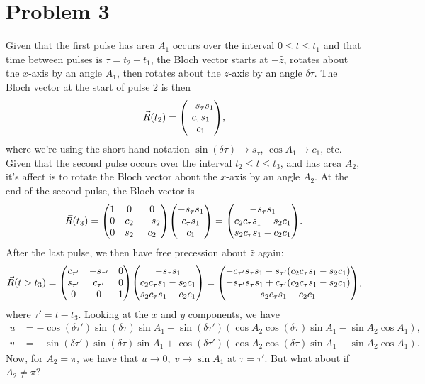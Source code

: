\documentclass[12pt]{article}
\begin{document}
\section*{Problem 3}
Given that the first pulse has area $A_1$ occurs over the interval $0 \leq t \leq t_1$ and that time between pulses is $\tau = t_2-t_1$, the Bloch vector starts at $-\hat{z}$, rotates about the $x$-axis by an angle $A_1$, then rotates about the $z$-axis by an angle $\delta \tau$.
The Bloch vector at the start of pulse 2 is then
\[ \vec{R}(t_2) = \mqty(-s_\tau s_1 \\ c_\tau s_1 \\ c_1), \]
where we're using the short-hand notation $\sin(\delta\tau) \to s_\tau$, $\cos A_1 \to c_1$, etc.
Given that the second pulse occurs over the interval $t_2 \leq t \leq t_3$, and has area $A_2$, it's affect is to rotate the Bloch vector about the $x$-axis by an angle $A_2$.
At the end of the second pulse, the Bloch vector is
\[ \vec{R}(t_3) = \mqty(1&0&0\\0&c_2&-s_2\\0&s_2&c_2)\mqty(-s_\tau s_1 \\ c_\tau s_1 \\ c_1) = \mqty(-s_\tau s_1 \\ c_2c_\tau s_1 - s_2 c_1\\ s_2 c_\tau s_1 - c_2c_1). \]
After the last pulse, we then have free precession about $\hat{z}$ again:
\[ \vec{R}(t>t_3) = \mqty(c_{\tau'}&-s_{\tau'}&0\\s_{\tau'}&c_{\tau'}&0\\0&0&1)\mqty(-s_\tau s_1 \\ c_2c_\tau s_1 - s_2 c_1\\ s_2 c_\tau s_1 - c_2c_1) = \mqty(-c_{\tau'}s_\tau s_1 - s_{\tau'}(c_2c_\tau s_1 - s_2c_1)\\-s_{\tau'}s_\tau s_1 + c_{\tau'}(c_2 c_\tau s_1 - s_2 c_1) \\ s_2 c_\tau s_1 - c_2c_1), \]
where $\tau' = t-t_3$. Looking at the $x$ and $y$ components, we have
\begin{align*}
	u &= -\cos(\delta\tau')\sin(\delta\tau)\sin A_1 - \sin(\delta\tau')\left(\cos A_2\cos(\delta\tau)\sin A_1 - \sin A_2\cos A_1\right), \\
	v &= -\sin(\delta\tau')\sin(\delta\tau)\sin A_1 + \cos(\delta\tau')\left(\cos A_2\cos(\delta\tau)\sin A_1 - \sin A_2\cos A_1\right).
\end{align*}
Now, for $A_2 = \pi$, we have that $u\to0,\;v\to\sin A_1$ at $\tau = \tau'$. But what about if $A_2 \neq \pi$?
\end{document}
